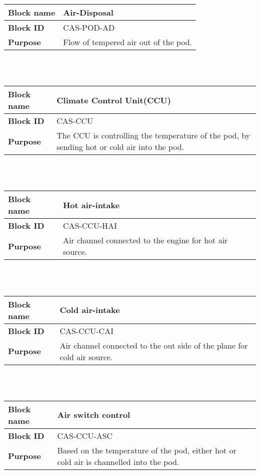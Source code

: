 \begin{tabular}{|l|p{10cm}|}
    \hline
    \textbf{Block name}     & Air-Disposal \\
    \hline
    \textbf{Block ID}       & CAS-POD-AD \\
    \hline
    \textbf{Purpose}        & Flow of tempered air out of the pod.  \\
    \hline
\end{tabular}\\\\

\begin{tabular}{|l|p{10cm}|}
    \hline
    \textbf{Block name}     & Climate Control Unit(CCU) \\
    \hline
    \textbf{Block ID}       & CAS-CCU \\
    \hline
    \textbf{Purpose}        & The CCU is controlling the temperature of the pod, by sending hot or cold air into the pod. \\
    \hline
\end{tabular}\\\\

\begin{tabular}{|l|p{10cm}|}
    \hline
    \textbf{Block name}     & Hot air-intake \\
    \hline
    \textbf{Block ID}       & CAS-CCU-HAI \\
    \hline
    \textbf{Purpose}        & Air channel connected to the engine for hot air source.  \\
    \hline
\end{tabular}\\\\

\begin{tabular}{|l|p{10cm}|}
    \hline
    \textbf{Block name}     & Cold air-intake \\
    \hline
    \textbf{Block ID}       & CAS-CCU-CAI \\
    \hline
    \textbf{Purpose}        & Air channel connected to the out side of the plane for cold air source. \\
    \hline
\end{tabular}\\\\

\begin{tabular}{|l|p{10cm}|}
    \hline
    \textbf{Block name}     & Air switch control \\
    \hline
    \textbf{Block ID}       & CAS-CCU-ASC \\
    \hline
    \textbf{Purpose}        & Based on the temperature of the pod, either hot or cold air is channelled into the pod. \\
    \hline
\end{tabular}\\\\


